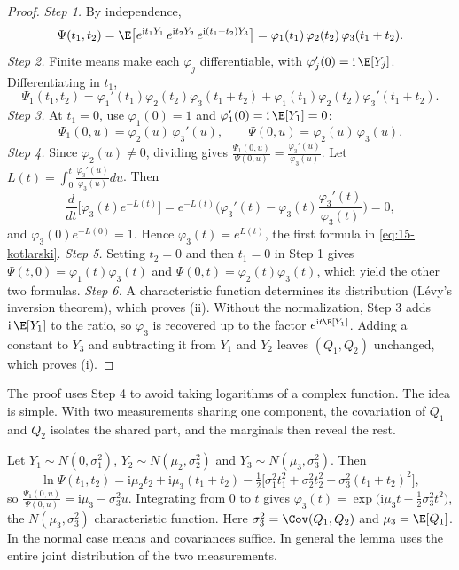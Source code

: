 \begin{proof}
\emph{Step 1.} By independence,
\[
\Psi(t_1,t_2)=\E\big[e^{\mathrm it_1Y_1}\,e^{\mathrm it_2Y_2}\,e^{\mathrm i(t_1+t_2)Y_3}\big]
=\varphi_1(t_1)\,\varphi_2(t_2)\,\varphi_3(t_1+t_2).
\]
\emph{Step 2.} Finite means make each $\varphi_j$ differentiable, with $\varphi_j'(0)=\mathrm i\,\E[Y_j]$.
Differentiating in $t_1$,
\[
\Psi_1(t_1,t_2)=\varphi_1'(t_1)\varphi_2(t_2)\varphi_3(t_1+t_2)+\varphi_1(t_1)\varphi_2(t_2)\varphi_3'(t_1+t_2).
\]
\emph{Step 3.} At $t_1=0$, use $\varphi_1(0)=1$ and $\varphi_1'(0)=\mathrm i\,\E[Y_1]=0$:
\[
\Psi_1(0,u)=\varphi_2(u)\,\varphi_3'(u),\qquad \Psi(0,u)=\varphi_2(u)\,\varphi_3(u).
\]
\emph{Step 4.} Since $\varphi_2(u)\neq0$, dividing gives
$\frac{\Psi_1(0,u)}{\Psi(0,u)}=\frac{\varphi_3'(u)}{\varphi_3(u)}$. Let
$L(t)=\int_0^t\frac{\varphi_3'(u)}{\varphi_3(u)}du$. Then
\[
\frac{d}{dt}\Big[\varphi_3(t)e^{-L(t)}\Big]=e^{-L(t)}\Big(\varphi_3'(t)-\varphi_3(t)\frac{\varphi_3'(t)}{\varphi_3(t)}\Big)=0,
\]
and $\varphi_3(0)e^{-L(0)}=1$. Hence $\varphi_3(t)=e^{L(t)}$, the first formula in \eqref{eq:15-kotlarski}.
\emph{Step 5.} Setting $t_2=0$ and then $t_1=0$ in Step 1 gives $\Psi(t,0)=\varphi_1(t)\varphi_3(t)$ and
$\Psi(0,t)=\varphi_2(t)\varphi_3(t)$, which yield the other two formulas.
\emph{Step 6.} A characteristic function determines its distribution (L\'evy's inversion theorem),
which proves (ii). Without the normalization, Step 3 adds $\mathrm i\,\E[Y_1]$ to the ratio, so
$\varphi_3$ is recovered up to the factor $e^{\mathrm it\E[Y_1]}$. Adding a constant to $Y_3$ and
subtracting it from $Y_1$ and $Y_2$ leaves $(Q_1,Q_2)$ unchanged, which proves (i).
\end{proof}

The proof uses Step 4 to avoid taking logarithms of a complex function. The idea is simple. With two
measurements sharing one component, the covariation of $Q_1$ and $Q_2$ isolates the shared part, and
the marginals then reveal the rest.

\begin{example}\label{ex:15-kotlarski-normal}
Let $Y_1\sim N(0,\sigma_1^2)$, $Y_2\sim N(\mu_2,\sigma_2^2)$ and $Y_3\sim N(\mu_3,\sigma_3^2)$. Then
\[
\ln\Psi(t_1,t_2)=\mathrm i\mu_2t_2+\mathrm i\mu_3(t_1+t_2)-\tfrac{1}{2}\big[\sigma_1^2t_1^2+\sigma_2^2t_2^2+\sigma_3^2(t_1+t_2)^2\big],
\]
so $\frac{\Psi_1(0,u)}{\Psi(0,u)}=\mathrm i\mu_3-\sigma_3^2u$. Integrating from $0$ to $t$ gives
$\varphi_3(t)=\exp\big(\mathrm i\mu_3t-\frac{1}{2}\sigma_3^2t^2\big)$, the $N(\mu_3,\sigma_3^2)$
characteristic function. Here $\sigma_3^2=\Cov(Q_1,Q_2)$ and $\mu_3=\E[Q_1]$. In the normal case means
and covariances suffice. In general the lemma uses the entire joint distribution of the two
measurements.
\end{example}

